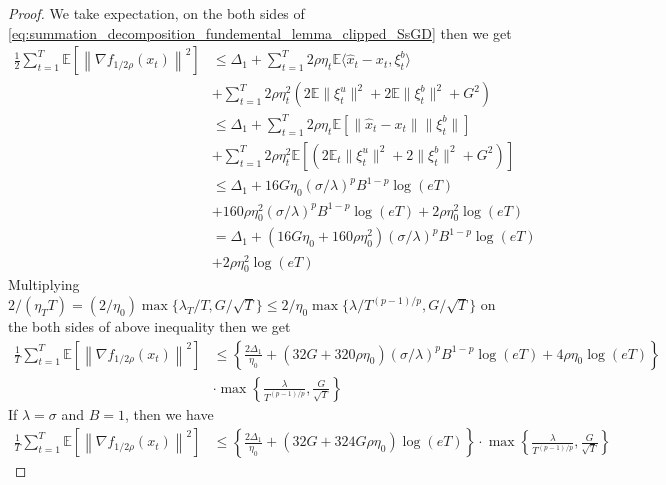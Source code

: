 \documentclass{article}
\def \E {\mathbb{E}}
\def \hx {\hat{x}}
\def \sumT {\sum_{t=1}^T}
\def \nab {\nabla}
\newcommand{\norm}[2][]{\left\|#2\right\|^{#1}}
\begin{document}
\begin{proof}
    We take expectation, on the both sides of \eqref{eq:summation_decomposition_fundemental_lemma_clipped_SsGD} then we get
    \begin{align}
        \frac{1}{2}\sum_{t=1}^T \E\left[\norm[2]{\nab f_{1/2\rho}(x_t)}\right] &\leq \Delta_1 + \sumT 2\rho\eta_t\E\langle\hx_t-x_t,\xi_t^b\rangle\nonumber\\
        &+ \sumT 2\rho\eta_t^2 (2\E\|\xi_t^u\|^2+2\E\|\xi_t^b\|^2+G^2)\nonumber\\
        &\leq \Delta_1 + \sumT 2\rho\eta_t\E[\|\hx_t-x_t\|\|\xi_t^b\|]\nonumber\\
        &+ \sumT 2\rho\eta_t^2 \E[(2\E_t\|\xi_t^u\|^2+2\|\xi_t^b\|^2+G^2)]\nonumber\\
        &\leq \Delta_1 + 16G\eta_0(\sigma/\lambda)^pB^{1-p}\log(eT)\nonumber\\
        &+160\rho\eta_0^2(\sigma/\lambda)^pB^{1-p}\log(eT)+ 2\rho\eta_0^2\log(eT)\nonumber\\
        &= \Delta_1 + (16G\eta_0+160\rho\eta_0^2)(\sigma/\lambda)^pB^{1-p}\log(eT)\nonumber\\
        &+2\rho\eta_0^2\log(eT)
    \end{align}
    Multiplying $2/(\eta_TT) = (2/\eta_0)\max\{\lambda_T/T,G/\sqrt{T}\}\leq 2/\eta_0\max\{\lambda/T^{(p-1)/p},G/\sqrt{T}\}$ on the both sides of above inequality then we get
    \begin{align}
        \frac{1}{T} \sumT \E\left[\norm[2]{\nab f_{1/2\rho}(x_t)}\right]&\leq \left\{\frac{2\Delta_1}{\eta_0} + (32G+320\rho\eta_0)(\sigma/\lambda)^pB^{1-p}\log(eT)+4\rho\eta_0\log(eT)\right\}\nonumber\\
        &\cdot \max\left\{\frac{\lambda}{T^{(p-1)/p}},\frac{G}{\sqrt{T}}\right\}
    \end{align}
    If $\lambda=\sigma$ and $B=1$, then we have
    \begin{align}
         \frac{1}{T} \sumT \E\left[\norm[2]{\nab f_{1/2\rho}(x_t)}\right]&\leq\left\{\frac{2\Delta_1}{\eta_0}+\left(32G+324G\rho\eta_0\right)\log(eT)\right\}\cdot\max\left\{\frac{\lambda}{T^{(p-1)/p}},\frac{G}{\sqrt{T}}\right\}
    \end{align}
\end{proof}
\end{document}
